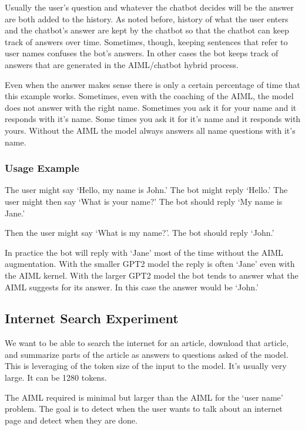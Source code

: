 Usually the user's question and whatever the chatbot decides will be the answer are both added to the history. As noted before, history of what the user enters and the chatbot's answer are kept by the chatbot so that the chatbot can keep track of answers over time. Sometimes, though, keeping sentences that refer to user names confuses the bot's answers. In other cases the bot keeps track of answers that are generated in the AIML/chatbot hybrid process.

Even when the answer makes sense there is only a certain percentage of time that this example works. Sometimes, even with the coaching of the AIML, the model does not answer with the right name. Sometimes you ask it for your name and it responds with it's name. Some times you ask it for it's name and it responds with yours. Without the AIML the model always answers all name questions with it's name.

\subsubsection{Usage Example}

The user might say `Hello, my name is John.' The bot might reply `Hello.' The user might then say `What is your name?' The bot should reply `My name is Jane.'

Then the user might say `What is my name?'. The bot should reply `John.'

In practice the bot will reply with `Jane' most of the time without the AIML augmentation. With the smaller GPT2 model the reply is often `Jane' even with the AIML kernel. With the larger GPT2 model the bot tends to answer what the AIML suggests for its answer. In this case the answer would be `John.'

\subsection{Internet Search Experiment}

We want to be able to search the internet for an article, download that article, and summarize parts of the article as answers to questions asked of the model. This is leveraging of the token size of the input to the model. It's usually very large. It can be 1280 tokens.

The AIML required is minimal but larger than the AIML for the `user name' problem. The goal is to detect when the user wants to talk about an internet page and detect when they are done.

